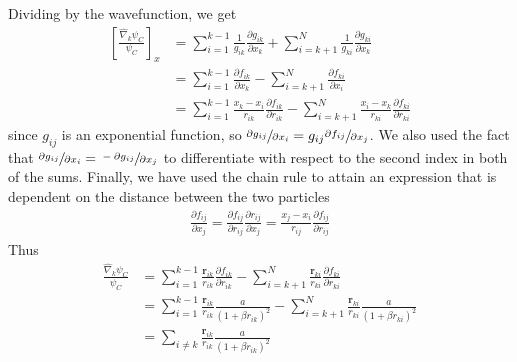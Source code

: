 \documentclass[twocolumns, a4paper,11pt,fleqn]{extarticle}
\newcommand{\eq}[1]{{\small\begin{align*}#1\end{align*}}}
\renewcommand\vec[1]{\boldsymbol{\mathbf{#1}}}
\newcommand{\op}[1]{\hat{#1}}
\begin{document}
Dividing by the wavefunction, we get
\eq{
  \left[\frac{\op\nabla_k\psi_C}{\psi_C}\right]_x
  &=\sum_{i=1}^{k-1}\frac{1}{g_{ik}}\frac{\partial g_{ik}}{\partial x_k}  
  + \sum_{i=k+1}^{N}\frac{1}{g_{ki}}\frac{\partial g_{ki}}{\partial x_k} \\
  &=\sum_{i=1}^{k-1}\frac{\partial f_{ik}}{\partial x_k}  
  - \sum_{i=k+1}^{N}\frac{\partial f_{ki}}{\partial x_i}\\
  &=\sum_{i=1}^{k-1}\frac{x_k-x_i}{r_{ik}}\frac{\partial f_{ik}}{\partial r_{ik}}  
  - \sum_{i=k+1}^{N}\frac{x_i-x_k}{r_{ki}}\frac{\partial f_{ki}}{\partial r_{ki}}
}
since $g_{ij}$ is an exponential function, so
$\sfrac{\partial g_{ij}}{\partial x_i} = g_{ij} \sfrac{\partial f_{ij}}{\partial x_j}$.
We also used the fact that $\sfrac{\partial g_{ij}}{\partial x_i} = \sfrac{-\partial g_{ij}}{\partial x_j}$ to differentiate with respect to the second index in both of the sums.
Finally, we have used the chain rule to attain an expression that is dependent
on the distance between the two particles
\eq{
  \frac{\partial f_{ij}}{\partial x_j} 
  = \frac{\partial f_{ij}}{\partial r_{ij}} \frac{\partial r_{ij}}{\partial x_j} 
  = \frac{x_j - x_i}{r_{ij}} \frac{\partial f_{ij}}{\partial r_{ij}}
}
Thus
\eq{
  \frac{\op\nabla_k\psi_C}{\psi_C} &=
    \sum_{i=1}^{k-1}\frac{\vec r_{ik}}{r_{ik}}\frac{\partial f_{ik}}{\partial r_{ik}}  
    - \sum_{i=k+1}^{N}\frac{\vec r_{ki}}{r_{ki}}\frac{\partial f_{ki}}{\partial r_{ki}}\\
    &=\sum_{i=1}^{k-1}\frac{\vec r_{ik}}{r_{ik}}\frac{a}{(1+\beta r_{ik})^2}  
    - \sum_{i=k+1}^{N}\frac{\vec r_{ki}}{r_{ki}}\frac{a}{(1+\beta r_{ki})^2}\\
    &=\sum_{i\neq k}\frac{\vec r_{ik}}{r_{ik}}\frac{a}{(1+\beta r_{ik})^2} 
}
\end{document}

